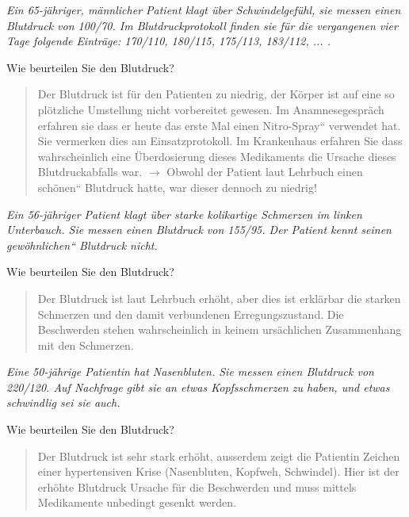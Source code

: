 
\emph{Ein 65-j\"ahriger, m\"annlicher Patient klagt \"uber
Schwindelgef\"uhl, sie messen einen Blutdruck von 100/70. Im Blutdruckprotokoll finden sie
f\"ur die vergangenen vier Tage folgende Eintr\"age: 170/110, 180/115,
175/113, 183/112, ... .}


Wie beurteilen Sie den Blutdruck? 

\begin{quote}
Der Blutdruck ist f\"ur den Patienten zu niedrig, der K\"orper ist auf
eine so pl\"otzliche Umstellung nicht vorbereitet gewesen. Im
Anamnesegespr\"ach erfahren sie dass er heute das erste Mal einen
{\quotedblbase}Nitro-Spray{\textquotedblleft} verwendet hat. Sie
vermerken dies am Einsatzprotokoll. Im Krankenhaus erfahren Sie dass
wahrscheinlich eine \"Uberdosierung dieses Medikaments die Ursache
dieses Blutdruckabfalls war. ${\rightarrow}$ Obwohl der Patient laut
Lehrbuch einen {\quotedblbase}sch\"onen{\textquotedblleft} Blutdruck
hatte, war dieser dennoch zu niedrig!
\end{quote}

\emph{Ein 56-j\"ahriger Patient klagt \"uber starke
kolikartige Schmerzen im linken Unterbauch. Sie messen einen Blutdruck von 155/95. Der Patient
kennt seinen {\quotedblbase}gew\"ohnlichen{\textquotedblleft} Blutdruck
nicht.}  

Wie beurteilen Sie den Blutdruck? 

\begin{quote}
Der Blutdruck ist laut Lehrbuch erh\"oht, aber dies ist erkl\"arbar die
starken Schmerzen und den damit verbundenen Erregungszustand. Die
Beschwerden stehen wahrscheinlich in keinem urs\"achlichen Zusammenhang
mit den Schmerzen. 
\end{quote}

\emph{Eine 50-j\"ahrige Patientin hat Nasenbluten. Sie
messen einen Blutdruck von 220/120. Auf Nachfrage gibt sie an etwas Kopfsschmerzen zu haben,
und etwas schwindlig sei sie auch.} 

Wie beurteilen Sie den Blutdruck? 

\begin{quote}
Der Blutdruck ist sehr stark erh\"oht, ausserdem zeigt die Patientin
Zeichen einer hypertensiven Krise (Nasenbluten, Kopfweh, Schwindel).
Hier ist der erh\"ohte Blutdruck Ursache f\"ur die Beschwerden und muss
mittels Medikamente unbedingt gesenkt werden. 
\end{quote}




